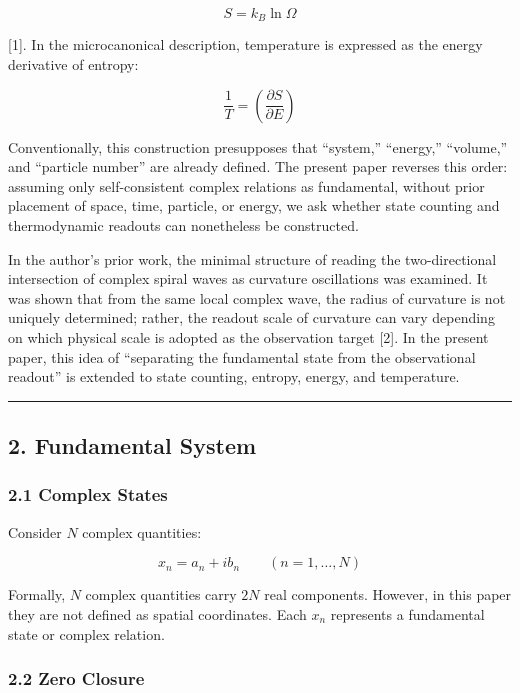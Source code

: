 \documentclass[
  a4paper,
]{article}
\begin{document}
\[
S=k_B\ln\Omega
\]

{[}1{]}. In the microcanonical description, temperature is expressed as
the energy derivative of entropy:

\[
\frac{1}{T}
=
\left(\frac{\partial S}{\partial E}\right)
\]

Conventionally, this construction presupposes that ``system,''
``energy,'' ``volume,'' and ``particle number'' are already defined. The
present paper reverses this order: assuming only self-consistent complex
relations as fundamental, without prior placement of space, time,
particle, or energy, we ask whether state counting and thermodynamic
readouts can nonetheless be constructed.

In the author's prior work, the minimal structure of reading the
two-directional intersection of complex spiral waves as curvature
oscillations was examined. It was shown that from the same local complex
wave, the radius of curvature is not uniquely determined; rather, the
readout scale of curvature can vary depending on which physical scale is
adopted as the observation target {[}2{]}. In the present paper, this
idea of ``separating the fundamental state from the observational
readout'' is extended to state counting, entropy, energy, and
temperature.

\begin{center}\rule{0.5\linewidth}{0.5pt}\end{center}

\subsection{2. Fundamental System}\label{fundamental-system}

\subsubsection{2.1 Complex States}\label{complex-states}

Consider \(N\) complex quantities:

\[
x_n=a_n+i b_n
\qquad
(n=1,\ldots,N)
\]

Formally, \(N\) complex quantities carry \(2N\) real components.
However, in this paper they are not defined as spatial coordinates. Each
\(x_n\) represents a fundamental state or complex relation.

\subsubsection{2.2 Zero Closure}\label{zero-closure}
\end{document}
